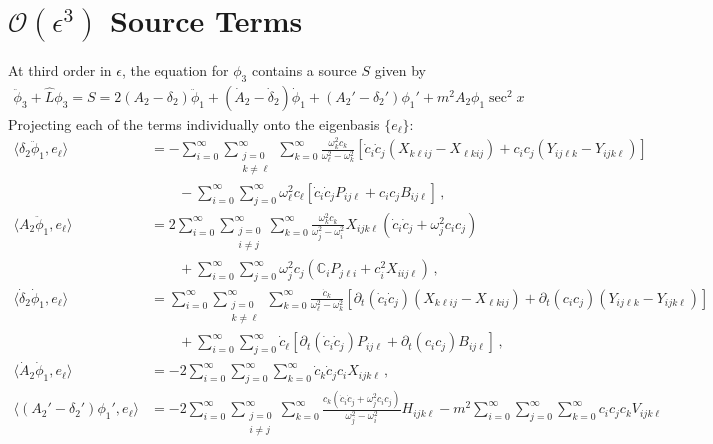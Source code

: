 \documentclass[letterpaper,11pt]{article}
\newcommand{\p}{\partial}
\newcommand{\oi}{\omega_i}
\newcommand{\oj}{\omega_j}
\newcommand{\ok}{\omega_k}
\newcommand{\ol}{\omega_\ell}
\newcommand{\mc}{\mathcal}
\begin{document}
\section{$\mc O(\epsilon^3)$ Source Terms}
At third order in $\epsilon$, the equation for $\phi_3$ contains a source $S$ given by
\begin{align}
\ddot \phi_3 + \hat L \phi_3 = S = 2 (A_2 - \delta_2) \ddot \phi_1 + (\dot A_2 - \dot \delta_2) \dot\phi_1 + (A_2' -\delta_2' )\phi_1' + m^2 A_2 \phi_1 \sec^2 x
\end{align}
Projecting each of the terms individually onto the eigenbasis $\{ e_\ell \}$:
\begin{align}
\langle \delta_2 \ddot \phi_1, e_\ell \rangle &= - \sum_{i = 0}^\infty \sum_{\substack{j=0 \\ k \neq \ell}}^\infty \sum_{k=0}^\infty \frac{\ok^2 c_k}{\ol^2 - \ok^2} \left[\dot c_i \dot c_j \left(X_{k\ell ij} - X_{\ell k i j} \right) + c_i c_j \left( Y_{ij\ell k} - Y_{ijk\ell} \right) \right] \nonumber \\
& \qquad  - \sum_{i=0}^\infty \sum_{j=0}^\infty \ol^2 c_\ell \left[ \dot c_i \dot c_j P_{ij\ell} + c_i c_j B_{i j \ell} \right] \, , \\
%
\langle A_2 \ddot \phi_1, e_\ell \rangle &= 2 \sum_{i = 0}^\infty \sum_{\substack{j=0 \\ i \neq j}}^\infty \sum_{k=0}^\infty \frac{\ok^2 c_k}{\oj^2 - \oi^2} X_{ijk \ell} \left( \dot c_i \dot c_j + \oj^2 c_i c_j \right) \nonumber \\
& \qquad + \sum_{i = 0}^\infty \sum_{j = 0}^\infty \oj^2 c_j \left( \mathbb C_i P_{j \ell i} + c_i^2 X_{ii j \ell} \right) \, , \\
%
\langle \dot \delta_2 \dot \phi_1 , e_\ell \rangle &= \sum_{i = 0}^\infty \sum_{\substack{j=0 \\ k \neq \ell}}^\infty \sum_{k=0}^\infty \frac{\dot c_k}{\ol^2 - \ok^2} \left[ \p_t \left( \dot c_i \dot c_j \right) \left( X_{k\ell ij} - X_{\ell k i j} \right) + \p_t (c_i c_j) \left(Y_{ij\ell k} - Y_{ijk\ell}\right) \right] \nonumber \\
& \qquad+ \sum_{i=0}^\infty \sum_{j=0}^\infty \dot c_\ell \left[ \p_t \left( \dot c_i \dot c_j \right) P_{ij\ell} + \p_t (c_i c_j) B_{ij\ell} \right] \, , \\
%
\langle \dot A_2 \dot \phi_1, e_\ell \rangle &= -2 \sum_{i=0}^\infty \sum_{j=0}^\infty \sum_{k=0}^\infty  \dot c_k \dot c_j c_i X_{ijk\ell} \, , \\
%
\langle \left( A_2' - \delta_2' \right) \phi_1', e_\ell \rangle &= - 2 \sum_{i = 0}^\infty \sum_{\substack{j=0 \\ i \neq j}}^\infty \sum_{k=0}^\infty \frac{c_k (\dot c_i \dot c_j + \oj^2 c_i c_j)}{\oj^2 -\oi^2} H_{ijk\ell} -m^2 \sum_{i=0}^\infty \sum _{j=0}^\infty \sum_{k=0}^\infty c_i c_j c_k V_{ijk\ell} \nonumber \\

\end{align}
\end{document}
